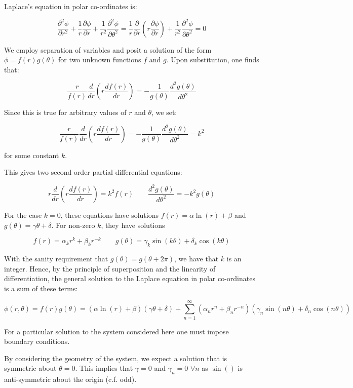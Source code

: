 \documentclass{article}
\newcommand{\be}{\begin{equation}}
\newcommand{\ee}{\end{equation}}
\begin{document}
Laplace's equation in polar co-ordinates is: 

\be
\frac{\partial^2 \phi}{\partial r^2}+\frac{1}{r}\frac{\partial \phi}{\partial r}+\frac{1}{r^2}\frac{\partial^2 \phi}{\partial \theta^2}
= \frac{1}{r}\frac{\partial}{\partial r}(r \frac{\partial \phi}{\partial r}) + \frac{1}{r^2}\frac{\partial ^2 \phi}{\partial \theta^2}
= 0
\ee

We employ separation of variables and posit a solution of the form
$\phi = f(r)g(\theta)$ for two unknown functions $f$ and $g$. Upon substitution,
one finds that:

\be
\frac{r}{f(r)}\frac{d}{dr}(r \frac{df(r)}{dr}) =- \frac{1}{g(\theta)}\frac{d^2 g(\theta)}{d\theta^2}
\ee

Since this is true for arbitrary values of $r$ and $\theta$, we set:

\be
\frac{r}{f(r)}\frac{d}{dr}(r \frac{df(r)}{dr}) =- \frac{1}{g(\theta)}\frac{d^2 g(\theta)}{d\theta^2}=k^2
\ee

for some constant $k$.

This gives two second order partial differential equations:

\be
r\frac{d}{dr}(r \frac{df(r)}{dr}) = k^2 f(r) \qquad
\frac{d^2 g(\theta)}{d\theta^2}=-k^2 g(\theta)
\ee

For the case $k=0$, these equations have solutions
$f(r)=\alpha \ln(r) + \beta$ and $g(\theta) = \gamma \theta + \delta$.
For non-zero $k$, they have solutions

\be
f(r)=\alpha_k r^k + \beta_k r^{-k}
\qquad
g(\theta)= \gamma_k \sin(k\theta)+\delta_k \cos(k\theta)
\ee

With the sanity requirement that $g(\theta)=g(\theta + 2\pi)$, we have that $k$ is
an integer. Hence, by the principle of superposition and the linearity of differentiation,
the general solution to the Laplace equation in polar co-ordinates is a sum of
these terms:

\be
\phi(r,\theta)
= f(r)g(\theta)
= (\alpha \ln(r) + \beta)(\gamma\theta + \delta) + \sum_{n=1}^{\infty}(\alpha_n r^n+\beta_n r^{-n})(\gamma_n \sin(n\theta) + \delta_n \cos(n\theta))
\ee

For a particular solution to the system considered here one must impose boundary
conditions.

By considering the geometry of the system, we expect a solution that is symmetric
about $\theta=0$. This implies that $\gamma = 0$ and $\gamma_n=0$ $\forall n$ as
$\sin()$ is anti-symmetric about the origin (c.f. odd).
\end{document}
